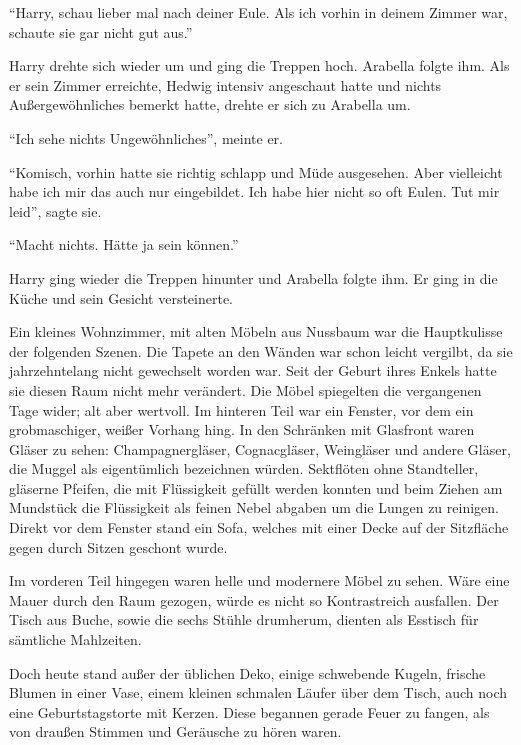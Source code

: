 \enquote{Harry, schau lieber mal nach deiner Eule. Als ich vorhin in deinem Zimmer war, schaute sie gar nicht gut aus.}

Harry drehte sich wieder um und ging die Treppen hoch. Arabella folgte ihm. Als er sein Zimmer erreichte, Hedwig intensiv angeschaut hatte und nichts Außergewöhnliches bemerkt hatte, drehte er sich zu Arabella um. 

\enquote{Ich sehe nichts Ungewöhnliches}, meinte er.

\enquote{Komisch, vorhin hatte sie richtig schlapp und Müde ausgesehen. Aber vielleicht habe ich mir das auch nur eingebildet. Ich habe hier nicht so oft Eulen. Tut mir leid}, sagte sie.

\enquote{Macht nichts. Hätte ja sein können.}

Harry ging wieder die Treppen hinunter und Arabella folgte ihm. Er ging in die Küche und sein Gesicht versteinerte.

\trenn


Ein kleines Wohnzimmer, mit alten Möbeln aus Nussbaum war die Hauptkulisse der folgenden Szenen. Die Tapete an den Wänden war schon leicht vergilbt, da sie jahrzehntelang nicht gewechselt worden war. Seit der Geburt ihres Enkels hatte sie diesen Raum nicht mehr verändert. Die Möbel spiegelten die vergangenen Tage wider; alt aber wertvoll. Im hinteren Teil war ein Fenster, vor dem ein grobmaschiger, weißer Vorhang hing. In den Schränken mit Glasfront waren Gläser zu sehen: Champagnergläser, Cognacgläser, Weingläser und andere Gläser, die Muggel als eigentümlich bezeichnen würden. Sektflöten ohne Standteller, gläserne Pfeifen, die mit Flüssigkeit gefüllt werden konnten und beim Ziehen am Mundstück die Flüssigkeit als feinen Nebel abgaben um die Lungen zu reinigen. Direkt vor dem Fenster stand ein Sofa, welches mit einer Decke auf der Sitzfläche gegen durch Sitzen geschont wurde.

Im vorderen Teil hingegen waren helle und modernere Möbel zu sehen. Wäre eine Mauer durch den Raum gezogen, würde es nicht so Kontrastreich ausfallen. Der Tisch aus Buche, sowie die sechs Stühle drumherum, dienten als Esstisch für sämtliche Mahlzeiten.

Doch heute stand außer der üblichen Deko, einige schwebende Kugeln, frische Blumen in einer Vase, einem kleinen schmalen Läufer über dem Tisch, auch noch eine Geburtstagstorte mit Kerzen. Diese begannen gerade Feuer zu fangen, als von draußen Stimmen und Geräusche zu hören waren.

